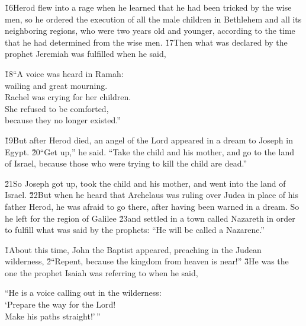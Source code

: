 \v{16}Herod flew into a rage when he learned that he had been tricked by the wise men, so he ordered the execution of all the male children in Bethlehem and all its neighboring regions, who were two years old and younger, according to the time that he had determined from the wise men. \v{17}Then what was declared by the prophet Jeremiah was fulfilled when he said,

\begin{poetry}
\poeml \v{18}``A voice was heard in Ramah: \\
\poemll    wailing and great mourning. \\
\poeml Rachel was crying for her children. \\
\poemll    She refused to be comforted, \\
\poemlll       because they no longer existed.''
\end{poetry}

\v{19}But after Herod died, an angel of the Lord appeared in a dream to Joseph in Egypt. \v{20}``Get up,'' he said. ``Take the child and his mother, and go to the land of Israel, because those who were trying to kill the child are dead.''

\v{21}So Joseph got up, took the child and his mother, and went into the land of Israel. \v{22}But when he heard that Archelaus was ruling over Judea in place of his father Herod, he was afraid to go there, after having been warned in a dream. So he left for the region of Galilee \v{23}and settled in a town called Nazareth in order to fulfill what was said by the prophets: ``He will be called a Nazarene.''

\v{1}About this time, John the Baptist appeared, preaching in the Judean wilderness, \v{2}``Repent, because the kingdom from heaven is near!'' \v{3}He was the one the prophet Isaiah was referring to when he said,

\begin{poetry}
\poeml ``He is a voice calling out in the wilderness: \\
\poemll    `Prepare the way for the Lord! \\
\poemlll       Make his paths straight!'\,''
\end{poetry}

